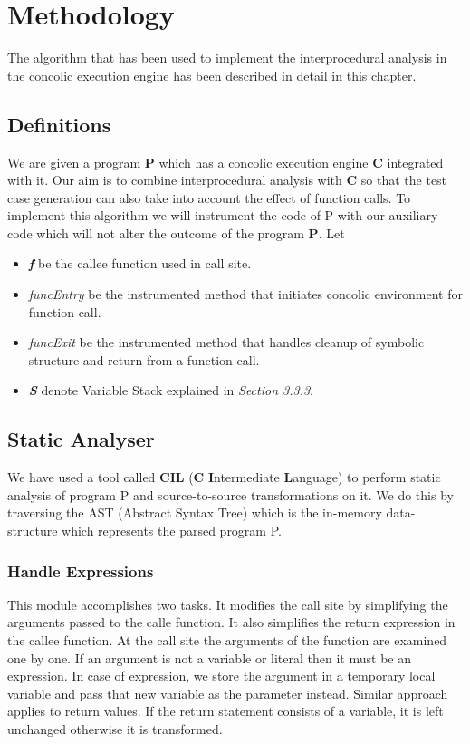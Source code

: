 \documentclass[12pt,oneside]{book}
\begin{document}
\newpage


\chapter{Methodology}
The algorithm that has been used to implement the interprocedural analysis in the concolic execution engine has been described in detail in this chapter.

\section{Definitions}

We are given a program \textbf{P} which has a concolic execution engine \textbf{C} integrated with it. Our aim is to combine interprocedural analysis with \textbf{C} so that the test case generation can also take into account the effect of function calls. To implement this algorithm we will instrument the code of P with our auxiliary code which will not alter the outcome of the program \textbf{P}. Let 

\begin{itemize}
\setlength\itemsep{0em}
  \item \textit{\textbf{f}} be the callee function used in call site.
 \item \textit{funcEntry} be the instrumented method that initiates concolic environment for function call.
 \item \textit{funcExit} be the instrumented method that handles cleanup of symbolic structure and return from a function call.
 \item \textit{\textbf{S}} denote Variable Stack explained in \textit{Section 3.3.3}.  
\end{itemize}

\section{Static Analyser}
We have used a tool called \textbf{CIL} (\textbf{C} \textbf{I}ntermediate \textbf{L}anguage) to perform static analysis of program P and source-to-source transformations on it. We do this by traversing the AST (Abstract Syntax Tree) which is the in-memory data-structure which represents the parsed program P.

\subsection{Handle Expressions}

This module accomplishes two tasks. It modifies the call site by simplifying the arguments passed to the calle function. It also simplifies the return expression in the callee function. At the call site the arguments of the function are examined one by one. If an argument is not a variable or literal then it must be an expression. In case of expression, we store the argument in a temporary local variable and pass that new variable as the parameter instead. Similar approach applies to return values. If the return statement consists of a variable, it is left unchanged otherwise it is transformed.\\
\end{document}
